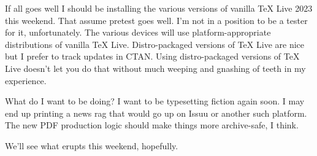 If all goes well I should be installing the various versions of vanilla
TeX Live 2023 this weekend. That assume pretest goes well. I'm not in a
position to be a tester for it, unfortunately. The various devices will
use platform-appropriate distributions of vanilla TeX Live.
Distro-packaged versions of TeX Live are nice but I prefer to track
updates in CTAN. Using distro-packaged versions of TeX Live doesn't let
you do that without much weeping and gnashing of teeth in my experience.

What do I want to be doing? I want to be typesetting fiction again soon.
I may end up printing a news rag that would go up on Issuu or another
such platform. The new PDF production logic should make things more
archive-safe, I think.

We'll see what erupts this weekend, hopefully.
